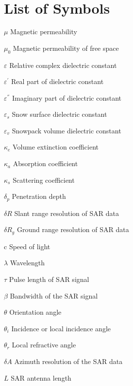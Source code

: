 \chapter*{List of Symbols}
\label{ch:sym}
\makeatletter
\makeatother
\newenvironment{symbols}{\begin{list}{}{\renewcommand{\makelabel}{\abbrlabel}
                                              \setlength{\itemsep}{0pt}}}{\end{list}}
\begin{symbols}
\item[$\mu$] 	Magnetic permeability
\item[$\mu_0$]	Magnetic permeability of free space
\item[$\varepsilon$] Relative complex dielectric constant
\item[$\varepsilon^{'}$]  Real part of dielectric constant 
\item[$\varepsilon^{''}$] Imaginary part of dielectric constant 
\item[$\varepsilon_{s}$] Snow surface dielectric constant
\item[$\varepsilon_{v}$] Snowpack volume dielectric constant
\item[$\kappa_e$] Volume extinction coefficient
\item[$\kappa_{a}$] Absorption coefficient
\item[$\kappa_{s}$]	Scattering coefficient
\item[$\delta_{p}$] Penetration depth
\item[$\delta R$]   Slant range resolution of SAR data
\item[$\delta R_g$]  Ground range resolution of SAR data
\item[$\mbox{c}$]	Speed of light
\item[$\lambda$]	Wavelength
\item[$\tau$] Pulse length of SAR signal
\item[$\beta$]  Bandwidth of the SAR signal
\item[$\theta$ ] 	Orientation angle 
\item[$\theta_{i}$] 	Incidence or local incidence angle
\item[$\theta_{r}$]  Local refractive angle 
\item[$\delta A$]	Azimuth resolution of the SAR data
\item[$L$]    SAR antenna length

\end{symbols}
